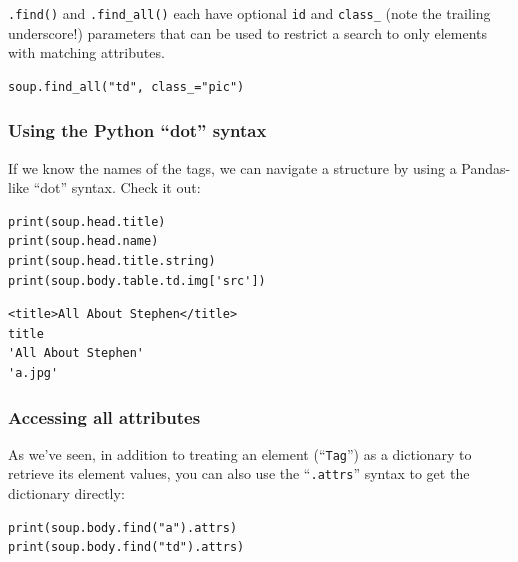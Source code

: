 
\texttt{.find()} and \texttt{.find\_all()} each have optional \texttt{id} and
\texttt{class\_} (note the trailing underscore!) parameters that can be used
to restrict a search to only elements with matching attributes.

\begin{Verbatim}[fontsize=\small,samepage=true,frame=single,framesep=3mm]
soup.find_all("td", class_="pic")
\end{Verbatim}

\subsubsection{Using the Python ``dot'' syntax}

If we know the names of the tags, we can navigate a structure by using a
Pandas-like ``dot'' syntax. Check it out:

\begin{Verbatim}[fontsize=\small,samepage=true,frame=single,framesep=3mm]
print(soup.head.title)
print(soup.head.name)
print(soup.head.title.string)
print(soup.body.table.td.img['src'])
\end{Verbatim}
\vspace{-.2in}

\begin{Verbatim}[fontsize=\small,samepage=true,frame=leftline,framesep=5mm,framerule=1mm]
<title>All About Stephen</title>
title
'All About Stephen'
'a.jpg'
\end{Verbatim}


\subsubsection{Accessing all attributes}


As we've seen, in addition to treating an element (``\texttt{Tag}'') as a
dictionary to retrieve its element values, you can also use the
``\texttt{.attrs}'' syntax to get the dictionary directly:

\begin{Verbatim}[fontsize=\small,samepage=true,frame=single,framesep=3mm]
print(soup.body.find("a").attrs)
print(soup.body.find("td").attrs)
\end{Verbatim}
\vspace{-.2in}

